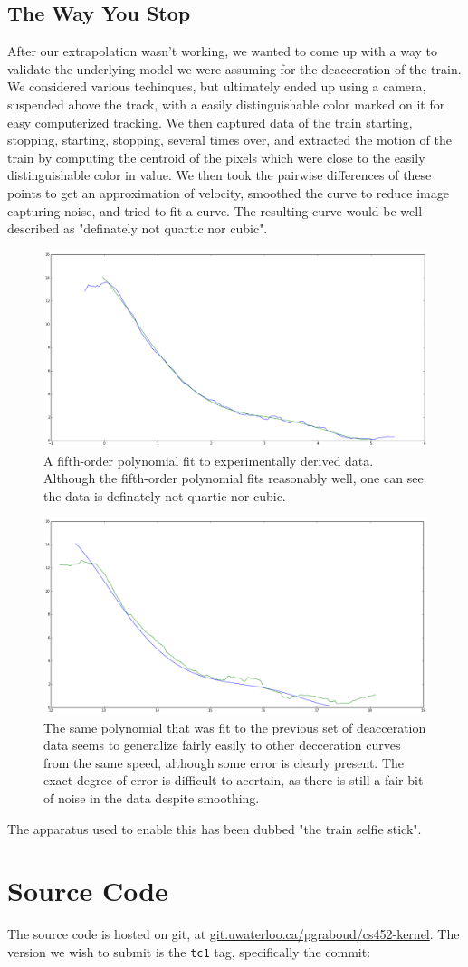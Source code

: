 \documentclass[titlepage]{article}
\begin{document}
\subsection{The Way You Stop}
After our extrapolation wasn't working, we wanted to come up with a way to
validate the underlying model we were assuming for the deacceration of the
train. We considered various techinques, but ultimately ended up using a
camera, suspended above the track, with a easily distinguishable color marked
on it for easy computerized tracking. We then captured data of the train
starting, stopping, starting, stopping, several times over, and extracted
the motion of the train by computing the centroid of the pixels which were
close to the easily distinguishable color in value. We then took the pairwise
differences of these points to get an approximation of velocity, smoothed the
curve to reduce image capturing noise, and tried to fit a curve. The resulting
curve would be well described as "definately not quartic nor cubic".
\begin{figure}[ht!]
\includegraphics[width=\linewidth]{deaccel.png}
\caption{A fifth-order polynomial fit to experimentally derived data. Although
the fifth-order polynomial fits reasonably well, one can see the data is
definately not quartic nor cubic.}
\end{figure}
\begin{figure}[ht!]
\includegraphics[width=\linewidth]{deaccel2.png}
\caption{The same polynomial that was fit to the previous set of deacceration
data seems to generalize fairly easily to other decceration curves from the
same speed, although some error is clearly present. The exact degree of error
is difficult to acertain, as there is still a fair bit of noise in the data
despite smoothing.}
\end{figure}
The apparatus used to enable this has been dubbed "the
train selfie stick".


\section{Source Code}
The source code is hosted on git, at \url{git.uwaterloo.ca/pgraboud/cs452-kernel}.
The version we wish to submit is the \texttt{tc1} tag, specifically
the commit:

\end{document}
